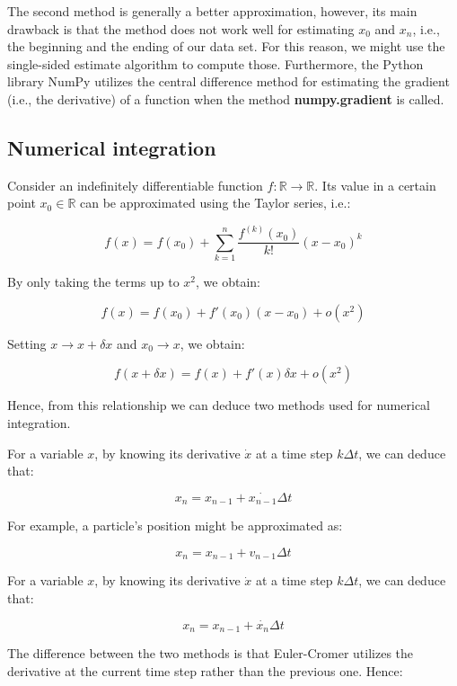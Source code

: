 \documentclass[12pt]{article}
\begin{document}
The second method is generally a better approximation, however, its main drawback is that the method does not work well for estimating $x_0$ and $x_n$, i.e., the beginning and the ending of our data set. For this reason, we might use the single-sided estimate algorithm to compute those. Furthermore, the Python library NumPy utilizes the central difference method for estimating the gradient (i.e., the derivative) of a function when the method \textbf{numpy.gradient} is called.

\subsection{Numerical integration}

Consider an indefinitely differentiable function $f : \mathbb{R} \to \mathbb{R}$. Its value in a certain point $x_0 \in \mathbb{R}$ can be approximated using the Taylor series, i.e.:

\[ f(x) = f(x_0) + \sum_{k = 1}^n \frac{f^{(k)}(x_0)}{k!} (x - x_0)^k \]

By only taking the terms up to $x^2$, we obtain:

\[ f(x) = f(x_0) + f'(x_0) (x - x_0) + o(x^2) \]

Setting $x \to x + \delta x$ and $x_0 \to x$, we obtain:

\[ f(x + \delta x) = f(x) + f'(x) \delta x + o(x^2) \]

Hence, from this relationship we can deduce two methods used for numerical integration.

\begin{definition}
    For a variable $x$, by knowing its derivative $\dot{x}$ at a time step $k\Delta t$, we can deduce that:

    \[ x_n = x_{n-1} + \dot{x_{n-1}}\Delta t \]
\end{definition}

For example, a particle's position might be approximated as:

\[ x_n = x_{n - 1} + v_{n - 1}\Delta t \]

\begin{definition}
    For a variable $x$, by knowing its derivative $\dot{x}$ at a time step $k\Delta t$, we can deduce that:

    \[ x_n = x_{n - 1} + \dot{x_n}\Delta t \]
\end{definition}

The difference between the two methods is that Euler-Cromer utilizes the derivative at the current time step rather than the previous one. Hence:
\end{document}
